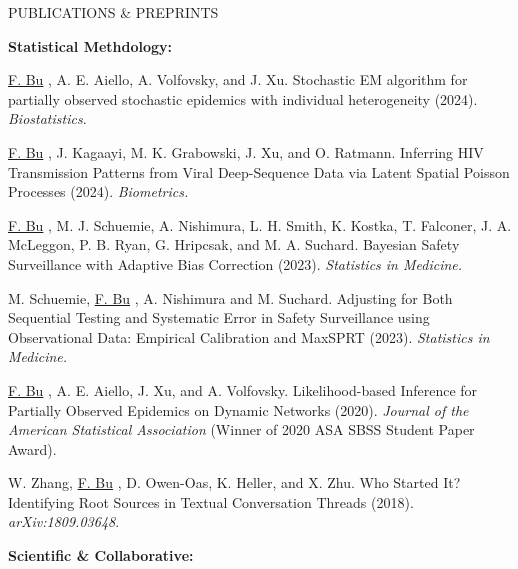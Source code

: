 \documentclass{resume} %
\newcommand{\myName}[1]{
	\underline{#1}
}
\begin{document}
\begin{rSection}{PUBLICATIONS \& PREPRINTS}

\hspace{-.2in} \textbf{Statistical Methdology:}

\myName{F. Bu}, A. E. Aiello, A. Volfovsky, and J. Xu.  
Stochastic EM algorithm for partially observed stochastic epidemics with individual heterogeneity (2024).  \emph{Biostatistics}.%

\smallskip

\myName{F. Bu}, J. Kagaayi, M. K. Grabowski, J. Xu, and O. Ratmann.
Inferring HIV Transmission Patterns from Viral Deep-Sequence Data via Latent Spatial Poisson Processes (2024). \emph{Biometrics.} 

\smallskip

\myName{F. Bu}, M. J. Schuemie,  A. Nishimura, L. H. Smith, K. Kostka, T. Falconer, J. A. McLeggon, P. B. Ryan, G. Hripcsak, and M. A. Suchard.
Bayesian Safety Surveillance with Adaptive Bias Correction (2023). \emph{Statistics in Medicine.} %

\smallskip


M. Schuemie, \myName{F. Bu}, A. Nishimura and M. Suchard.
Adjusting for Both Sequential Testing and Systematic Error in Safety Surveillance using Observational Data: Empirical Calibration and MaxSPRT (2023). \emph{Statistics in Medicine.}

\smallskip


\myName{F. Bu}, A. E. Aiello, J. Xu, and A. Volfovsky. 
Likelihood-based Inference for Partially Observed Epidemics on Dynamic Networks (2020). \emph{Journal of the American Statistical Association} (Winner of 2020 ASA SBSS Student Paper Award). %

\smallskip

%

W. Zhang, \myName{F. Bu}, D. Owen-Oas, K. Heller, and X. Zhu. 
Who Started It? Identifying Root Sources in Textual Conversation Threads (2018). \emph{arXiv:1809.03648}.

\medskip

\hspace{-.2in} \textbf{Scientific \& Collaborative:}


\end{rSection}
\end{document}
